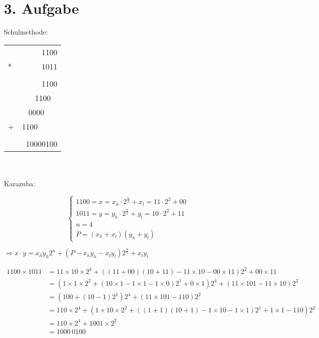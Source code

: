 \documentclass[fleqn]{article}
\begin{document}
\pagestyle{main}

\section{3. Aufgabe}

Schulmethode:
\\

\begin{tabular}{lr}
    &1100\\
    *&1011\\
    \hline\\
    &1100\\
    &1100 \ \! \\
    &0000 \ \! \ \! \\
    +&1100 \ \! \ \! \ \! \\
    \hline\\
    &10000100
\end{tabular}
\\
\\
Karazuba:

\begin{equation}
    \left\{
        \begin{array}{lr}
            1100 = x = x_h\cdot 2^{\frac{n}{2}} + x_l = 11\cdot 2^2 + 00\\
            1011 = y = y_h\cdot 2^{\frac{n}{2}} +y_l = 10\cdot 2^2 +11\\
            n = 4 \\
            P = (x_h + x_l)(y_h + y_l)
        \end{array}
    \right.
\end{equation}

$\Rightarrow x \cdot y = x_hy_h2^n+(P-x_hy_h-x_ly_l)2^{\frac{n}{2}} +x_ly_l$


\begin{equation}
    \begin{split}
        1100\times 1011 & = 11\times 10\times 2^4 + ((11+00)(10+11)-11\times 10 - 00\times 11)2^2+00\times 11 \\
        & = (1 \times 1 \times 2^2 + (10\times 1 - 1\times 1 - 1\times 0)2^1 + 0\times 1)2^4+(11\times 101 - 11\times 10)2^2 \\
        & = (100+(10-1)2^1)2^4 +(11\times 101 - 110)2^2 \\ 
        & = 110\times 2^4 + (1\times 10\times 2^2 + ((1+1)(10+1)-1\times 10 - 1\times 1)2^1 + 1\times 1 - 110)2^2\\
        & = 110\times 2^4 +1001\times 2^2\\
        & = 1000 \ 0100
    \end{split}
\end{equation}
\end{document}
